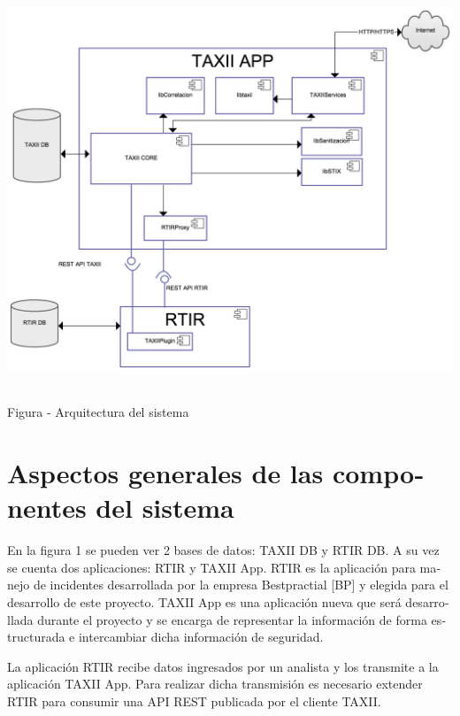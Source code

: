 \documentclass[11pt]{article}
\newcounter{Figura}
\renewcommand\theFigura{\arabic{Figura}}
\begin{document}
\bigskip

 \includegraphics[width=5.7638in,height=4.6846in]{Diseno21-img/Diseno21-img003.png} 

{\centering\bfserie
\foreignlanguage{spanish}{Figura }\stepcounter{Figura}{\theFigura}\foreignlanguage{spanish}{ - Arquitectura del sistema}
\par}


\bigskip

\section[Aspectos generales de las componentes del sistema]{\foreignlanguage{spanish}{Aspectos generales de las
componentes del sistema}}
\foreignlanguage{spanish}{En la figura 1 se pueden ver 2 bases de datos: TAXII DB y RTIR DB. A su vez se cuenta dos
aplicaciones: RTIR y TAXII App. RTIR es la aplicación para manejo de incidentes desarrollada por la empresa
Bestpractial [BP] y elegida para el desarrollo de este proyecto. TAXII App es una aplicación nueva que será
desarrollada durante el proyecto y se encarga de representar la información de forma estructurada e intercambiar dicha
información de seguridad.}

\foreignlanguage{spanish}{La aplicación RTIR recibe datos ingresados por un analista y los transmite a la aplicación
TAXII App. Para realizar dicha transmisión es necesario extender RTIR para consumir una API REST publicada por el
cliente TAXII.}
\end{document}
